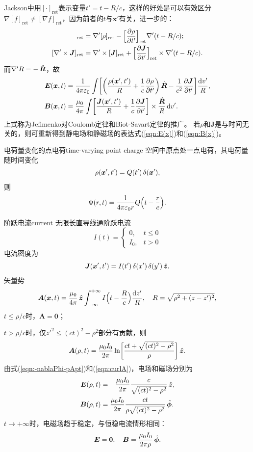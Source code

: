 Jackson中用$[\cdot]_\text{ret}$表示变量$t'=t-R/c$，这样的好处是可以有效区分$\nabla[f]_\text{ret}\neq[\nabla f]_\text{ret}$，因为前者的$t$与$\bm x'$有关，进一步的：
\begin{align*}
    [\nabla'\rho]_\text{ret}&=\nabla'[\rho]_\text{ret}-\Bigfkh{\pv\rho{t'}}_\text{ret}\nabla'(t-R/c);\\
    [\nabla'\times\bm J]_\text{ret}&=\nabla'\times[\bm J]_\text{ret}+\Bigfkh{\pv{\bm J}{t'}}_\text{ret}\times\nabla'(t-R/c).
\end{align*}
而$\nabla'R=-\mathop{}\!\hat{\bm R}$，故
\begin{align}
    \bm E(\bm x,t)&=\frac1{4\pi\varepsilon_0}\int\biggfkh{\biggkh{\frac{\rho(\bm x',t')}R+\frac1c\pv\rho{t'}}\uvec R-\frac1{c^2}\pv{\bm J}{t'}}\frac{\d v'}R,\\
    \bm B(\bm x,t)&=\frac{\mu_0}{4\pi}\int\biggfkh{\frac{\bm J(\bm x',t')}R+\frac1c\pv{\bm J}{t'}}\times\frac{\hat{\bm R}}R\d v'.
\end{align}
上式称为Jefimenko对Coulomb定律和Biot-Savart定律的推广。
若$\rho$和$\bm J$是与时间无关的，则可重新得到静电场和静磁场的表达式(\ref{eqn:E(x)})和(\ref{eqn:B(x)})。
\begin{example}{电荷量变化的点电荷}{time-varying point charge}
    空间中原点处一点电荷，其电荷量随时间变化
    \[
        \rho(\bm x',t')=Q(t')\mathop{}\!\delta(\bm x'),
    \]
    则
    \[
        \Phi(r,t)=\frac1{4\pi\varepsilon_0r}Q\Bigl(t-\frac rc\Bigr).
    \]
\end{example}
\begin{example}{阶跃电流}{current}
    无限长直导线通阶跃电流
    \[
        I(t)=\begin{cases}
            0,&t\leqslant 0\\
            I_0,&t>0
        \end{cases}
    \]
    电流密度为
    \[
        \bm J(\bm x',t')=I(t')\mathop{}\!\delta(x')\mathop{}\!\delta(y')\mathop{}\!\hat{\bm z}.
    \]
    矢量势
    \[
        \bm A(\bm x,t)=\frac{\mu_0}{4\pi}\mathop{}\!\hat{\bm z}\int_{-\infty}^{+\infty} I\Bigl(t-\frac Rc\Bigr)\frac{\mathop{}\!\mathrm{d} z'}R,\quad R=\sqrt{\rho^2+(z-z')^2},
    \]
    $t\leqslant\rho/c$时，$\bm A=\bm 0$；
    
    $t>\rho/c$时，仅$z'^2\leqslant(ct)^2-\rho^2$部分有贡献，则
    \[
        \bm A(\rho,t)=\frac{\mu_0I_0}{2\pi}\ln\biggl[\frac{ct+\sqrt{(ct)^2-\rho^2}}{\rho}\biggr]\mathop{}\!\hat{\bm z}.
    \]
    由式(\ref{eqn:-nablaPhi-pApt})和(\ref{eqn:curlA})，电场和磁场分别为
    \begin{align*}
        \bm E(\rho,t)&=-\frac{\mu_0I_0}{2\pi}\frac c{\sqrt{(ct)^2-\rho^2}}\mathop{}\!\hat{\bm z},\\
        \bm B(\rho,t)&=\frac{\mu_0I_0}{2\pi}\frac{ct}{\rho\sqrt{(ct)^2-\rho^2}}\mathop{}\!\hat{\bm \phi}.
    \end{align*}
    $t\to+\infty$时，电磁场趋于稳定，与恒稳电流情形相同：
    \[
        \bm E=\bm 0,\quad\bm B=\frac{\mu_0I_0}{2\pi\rho}\mathop{}\!\hat{\bm \phi}.
    \]
\end{example}
